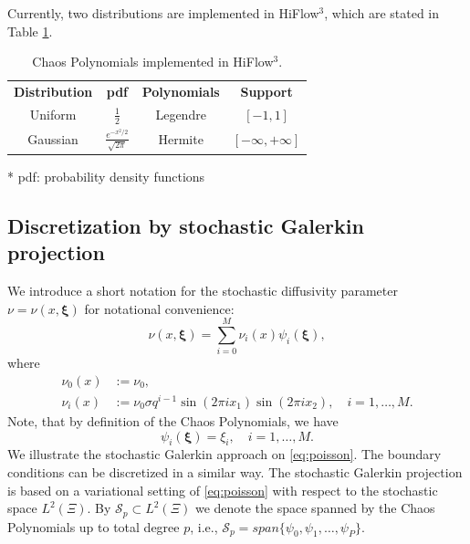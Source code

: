 \documentclass{article}
\begin{document}
Currently, two distributions are implemented in HiFlow$^3$, which are stated in Table \ref{tab:polynomials}.

\begin{table}[hbtp]\small
	\centering
	\begin{tabular}{|c|c|c|c|}
	\cline{1-4}
	\textbf{Distribution} & \textbf{pdf} & \textbf{Polynomials}  & \textbf{Support} \\ \cline{1-4}
	Uniform & $\frac{1}{2}$ & Legendre & $[-1,1]$ \\ \cline{1-4}
	Gaussian & $\frac{e^{-x^{2}/2}}{\sqrt{2 \pi}}$ & Hermite & $[-\infty, + \infty]$ \\ \cline{1-4} 
	\end{tabular}
	\begin{tablenotes}
	\item[*] pdf: probability density functions
	\end{tablenotes}
	\caption{Chaos Polynomials implemented in HiFlow$^3$.}
	\label{tab:polynomials}
\end{table}


\subsection{Discretization by stochastic Galerkin projection}
We introduce a short notation for the stochastic diffusivity parameter $\nu = \nu(x,\bm\xi)$ for notational convenience:
\begin{equation}
\label{eq:nu-short}
\nu(x,\bm\xi) = \sum_{i=0}^M \nu_i(x)\psi_i(\bm\xi),
\end{equation}
where
\begin{align*}
\nu_0(x) &:= \nu_0,\\
\nu_i(x) &:= \nu_0\sigma q^{i-1}\sin(2\pi i x_1)\sin(2\pi i x_2), \quad i=1,\ldots,M.
\end{align*}
Note, that by definition of the Chaos Polynomials, we have
\begin{equation}
\psi_i(\bm\xi) = \xi_i,\quad i=1,\ldots,M.
\end{equation}
We illustrate the stochastic Galerkin approach on \eqref{eq:poisson}. The boundary conditions can be discretized in a similar way. The stochastic Galerkin projection is based on a variational setting of \eqref{eq:poisson} with respect to the stochastic space $L^2(\Xi)$. By $\mathcal{S}_p \subset L^2(\Xi)$ we denote the space spanned by the Chaos Polynomials up to total degree $p$, i.e., $\mathcal{S}_p = span\{\psi_0,\psi_1,\ldots,\psi_P\}$.
\end{document}
